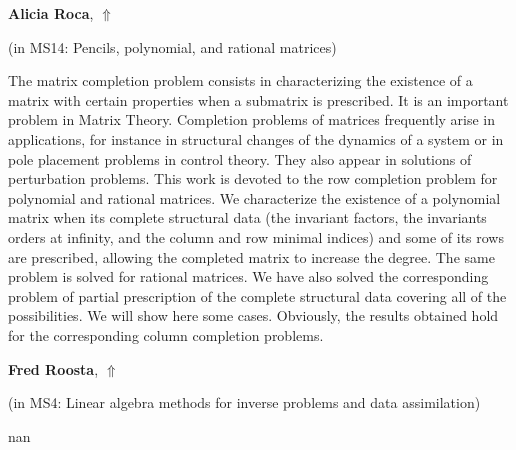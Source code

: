 \documentclass[ILAS2025-program.tex]{subfiles}
\begin{document}
     \hypertarget{down0373}{}\begin{ilasabstract}
    
    \textbf{Alicia Roca},  \hfill \hyperlink{up0373}{$\Uparrow$}
    
    (in {\color{mstitle}MS14: Pencils, polynomial, and rational matrices})
        
        \mtskip
    The matrix completion problem consists in characterizing the existence of a matrix with certain properties when a submatrix is prescribed.  It is an important problem in Matrix Theory.
Completion problems of matrices frequently arise in applications, for instance in structural changes of the dynamics of a system or in pole placement problems in control  theory. They also appear in solutions of perturbation problems. 
This work is devoted to the row completion problem for polynomial and rational matrices. 
We characterize the existence of a polynomial matrix when its complete structural data  (the invariant factors, the invariants orders at infinity, and the column and row minimal indices) and some of its rows are prescribed, allowing the completed matrix to increase the degree.
The same problem is solved for rational matrices.
We have also  solved the corresponding problem of partial prescription of the complete structural data covering  all of the possibilities. We will show here some cases.
Obviously, the results obtained hold for the corresponding column  completion problems.


\end{ilasabstract}
     \hypertarget{down0313}{}\begin{ilasabstract}
    
    \textbf{Fred Roosta},  \hfill \hyperlink{up0313}{$\Uparrow$}
    
    (in {\color{mstitle}MS4: Linear algebra methods for inverse problems and data assimilation})
        
        \mtskip
    nan\end{ilasabstract}
\end{document}
